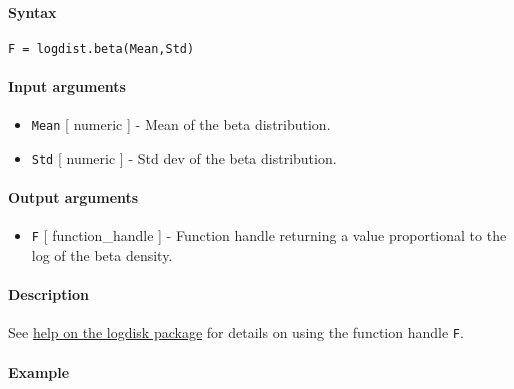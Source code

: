 


	\paragraph{Syntax}

\begin{verbatim}
F = logdist.beta(Mean,Std)
\end{verbatim}

\paragraph{Input arguments}

\begin{itemize}
\item
  \texttt{Mean} {[} numeric {]} - Mean of the beta distribution.
\item
  \texttt{Std} {[} numeric {]} - Std dev of the beta distribution.
\end{itemize}

\paragraph{Output arguments}

\begin{itemize}
\itemsep1pt\parskip0pt
\item
  \texttt{F} {[} function\_handle {]} - Function handle returning a
  value proportional to the log of the beta density.
\end{itemize}

\paragraph{Description}

See \href{logdist/Contents}{help on the logdisk package} for details on
using the function handle \texttt{F}.

\paragraph{Example}


